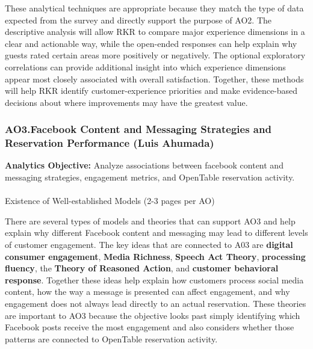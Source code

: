 \documentclass[
  12pt,
  letterpaper,
  DIV=11,
  numbers=noendperiod]{scrartcl}
\makeatletter
\let\oldparagraph\paragraph
\renewcommand{\paragraph}{
    \@ifstar
      \xxxParagraphStar
      \xxxParagraphNoStar
  }
\newcommand{\xxxParagraphStar}[1]{\oldparagraph*{#1}\mbox{}}
\newcommand{\xxxParagraphNoStar}[1]{\oldparagraph{#1}\mbox{}}
\makeatother
\begin{document}
These analytical techniques are appropriate because they match the type
of data expected from the survey and directly support the purpose of
AO2. The descriptive analysis will allow RKR to compare major experience
dimensions in a clear and actionable way, while the open-ended responses
can help explain why guests rated certain areas more positively or
negatively. The optional exploratory correlations can provide additional
insight into which experience dimensions appear most closely associated
with overall satisfaction. Together, these methods will help RKR
identify customer-experience priorities and make evidence-based
decisions about where improvements may have the greatest value.

\subsubsection{AO3.Facebook Content and Messaging Strategies and
Reservation Performance (Luis
Ahumada)}\label{ao3.facebook-content-and-messaging-strategies-and-reservation-performance-luis-ahumada}

\textbf{Analytics Objective:} Analyze associations between facebook
content and messaging strategies, engagement metrics, and OpenTable
reservation activity.

\paragraph{Existence of Well-established Models (2-3 pages per
AO)}\label{existence-of-well-established-models-2-3-pages-per-ao}

There are several types of models and theories that can support AO3 and
help explain why different Facebook content and messaging may lead to
different levels of customer engagement. The key ideas that are
connected to A03 are \textbf{digital consumer engagement}, \textbf{Media
Richness}, \textbf{Speech Act Theory}, \textbf{processing fluency}, the
\textbf{Theory of Reasoned Action}, and \textbf{customer behavioral
response}. Together these ideas help explain how customers process
social media content, how the way a message is presented can affect
engagement, and why engagement does not always lead directly to an
actual reservation. These theories are important to AO3 because the
objective looks past simply identifying which Facebook posts receive the
most engagement and also considers whether those patterns are connected
to OpenTable reservation activity.~
\end{document}
